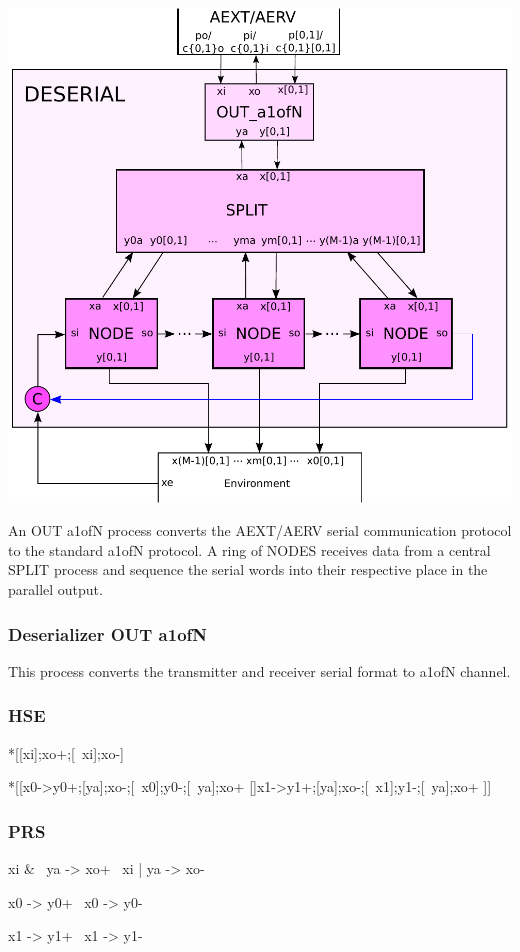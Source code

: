 \documentclass{article}
\begin{document}
\begin{center}
  \includegraphics[width=.45\textwidth]{img/deserial.pdf}
\end{center}

An OUT a1ofN process converts the AEXT/AERV serial communication protocol to the
standard a1ofN protocol. A ring of NODES receives data from a central SPLIT
process and sequence the serial words into their respective place in the parallel 
output. 

\subsubsection{Deserializer OUT a1ofN \label{sec:OUT_a1ofN}}

This process converts the transmitter and receiver serial format to a1ofN channel.

\subsubsection*{HSE}

\begin{hse}
*[[xi];xo+;[~xi];xo-]

*[[x0->y0+;[ya];xo-;[~x0];y0-;[~ya];xo+
  []x1->y1+;[ya];xo-;[~x1];y1-;[~ya];xo+
 ]]
\end{hse}

\subsubsection*{PRS}

\begin{prs2}
xi & ~ya -> xo+
~xi | ya -> xo-
\end{prs2}

\begin{prs2}
x0 -> y0+
~x0 -> y0-

x1 -> y1+
~x1 -> y1-
\end{prs2}
\end{document}

